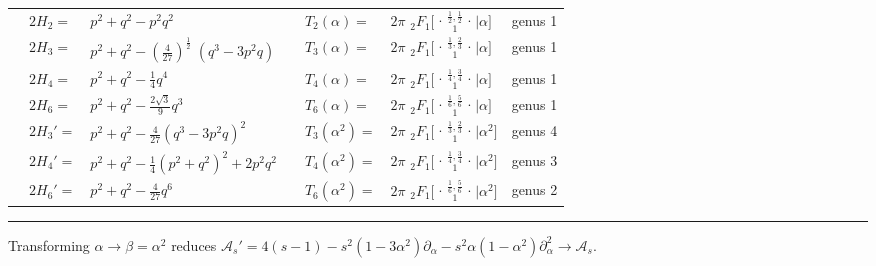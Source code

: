 \documentclass[nofootinbib,preprint]{revtex4-1}
\renewcommand{\arraystretch}{1.3}
\newcommand{\tFoIn}[3]{\,_2F_1 \Big[ 
\genfrac..{0pt}{}{#1}{#2}\Big| #3 \Big]}
\begin{document}
\begin{table}[t]
\begin{center}
\label{tab:Canonical}
{\renewcommand{\arraystretch}{2}%
\begin{tabularx}{\textwidth}{c  l  l | c l  l | l}
\hline \hline
\;\;\;&$2H_2=$ & $p^2+q^2-p^2 q^2$ & \;\;\;\; & $T_2(\alpha)=$ &
$2\pi\,\tFoIn{\frac{1}{2},\frac{1}{2}}{1}{\alpha}$ \hspace{1.0cm} & \;\;\; genus 1   \\
\;\;\;&$2H_3=$ & $p^2+q^2-(\frac{4}{27})^{\frac{1}{2}} \; ( q^3-3 p^2 q)$ \hspace{1.0cm} 
&& $T_3(\alpha)=$ &
$2\pi\,\tFoIn{\frac{1}{3},\frac{2}{3}}{1}{\alpha}$  & \;\;\; genus 1 \\
\;\;\;&$2H_4=$ & $p^2 + q^2 -\frac{1}{4}q^4$ 
&& $T_4(\alpha)=$ &   
$2\pi\,\tFoIn{\frac{1}{4},\frac{3}{4}}{1}{\alpha}$  & \;\;\; genus 1 \\
\;\;\;&$2H_6=$ & $p^2 + q^2 -\frac{2\sqrt{3}}{9}q^3$ 
&& $T_6(\alpha)=$ &
$2\pi\,\tFoIn{\frac{1}{6},\frac{5}{6}}{1}{\alpha}$  & \;\;\; genus 1 \\
\hline
\;\;\;&$2H_3'=$ & $p^2+q^2-\frac{4}{27}( q^3-3 p^2 q)^2$ 
&& $T_3(\alpha^2)=$ &
$2\pi\,\tFoIn{\frac{1}{3},\frac{2}{3}}{1}{\alpha^2}$  & \;\;\; genus 4 \\
\;\;\;&$2H_4'=$ & $p^2 + q^2  - \frac{1}{4}(p^2 + q^2)^2 +2 p^2 q^2 $ 
&& $T_4(\alpha^2)=$ &
$2\pi\,\tFoIn{\frac{1}{4},\frac{3}{4}}{1}{\alpha^2}$  & \;\;\; genus 3 \\
\;\;\;&$2H_6'=$ & $p^2+q^2-\frac{4}{27}q^6$ 
&& $T_6(\alpha^2)=$ &
$2\pi\,\tFoIn{\frac{1}{6},\frac{5}{6}}{1}{\alpha^2}$   & \;\;\; genus 2
\end{tabularx}}
\rule{\textwidth}{.01cm}
Transforming $\alpha \rightarrow \beta=\alpha^2$ reduces 
$\mathcal{A}_s'= 4(s-1)-s^2(1-3\alpha^2)\partial_{\alpha}-s^2\alpha(1-\alpha^2)\partial_{\alpha}^2 
\rightarrow \mathcal{A}_s $. 
\end{center}
\end{table}
\end{document}
